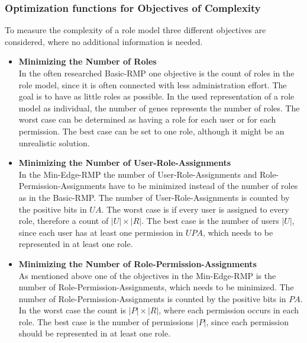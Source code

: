         \subsubsection{Optimization functions for Objectives of Complexity}
        To measure the complexity of a role model three different objectives are considered, where no additional information is needed.
        \begin{itemize}
            \item \textbf{Minimizing the Number of Roles}\\
            In the often researched Basic-RMP one objective is the count of roles in the role model, since it is often connected with less administration effort. The goal is to have as little roles as possible. In the used representation of a role model as individual, the number of genes represents the number of roles. The worst case can be determined as having a role for each user or for each permission. The best case can be set to one role, although it might be an unrealistic solution.
            \item \textbf{Minimizing the Number of User-Role-Assignments}\\
            In the Min-Edge-RMP the number of User-Role-Assignments and Role-Permission-Assignments have to be minimized instead of the number of roles as in the Basic-RMP. The number of User-Role-Assignments is counted by the positive bits in $UA$. The worst case is if every user is assigned to every role, therefore a count of $|U| \times |R|$. The best case is the number of users $|U|$, since each user has at least one permission in $UPA$, which needs to be represented in at least one role.
            \item \textbf{Minimizing the Number of Role-Permission-Assignments}\\
            As mentioned above one of the objectives in the Min-Edge-RMP is the number of Role-Permission-Assignments, which needs to be minimized. The number of Role-Permission-Assignments is counted by the positive bits in $PA$. In the worst case the count is $|P| \times |R|$, where each permission occurs in each role. The best case is the number of permissions $|P|$, since each permission should be represented in at least one role.
        \end{itemize}
